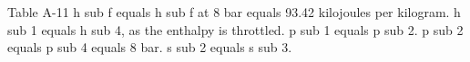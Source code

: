 Table A-11  
h sub f equals h sub f at 8 bar equals 93.42 kilojoules per kilogram.  
h sub 1 equals h sub 4, as the enthalpy is throttled.  
p sub 1 equals p sub 2.  
p sub 2 equals p sub 4 equals 8 bar.  
s sub 2 equals s sub 3.